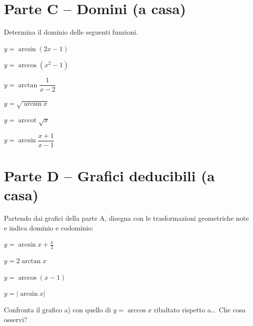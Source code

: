 \documentclass[11pt,a4paper]{article}
\DeclareMathOperator{\arccot}{arccot}
\begin{document}
\section*{Parte C -- Domini (a casa)}
Determina il dominio delle seguenti funzioni.
\begin{enumerate}[label=\alph*), itemsep=3pt]
\begin{minipage}[t]{0.42\textwidth}
\item $y=\arcsin(2x-1)$
\item $y=\arccos\left(x^2-1\right)$
\item $y=\arctan\dfrac{1}{x-2}$
\end{minipage}
\begin{minipage}[t]{0.42\textwidth}
\item $y=\sqrt{\arcsin x}$
\item $y=\arccot\sqrt{x}$
\item[$\ast$f)] $y=\arcsin\dfrac{x+1}{x-1}$
\end{minipage}
\end{enumerate}

\section*{Parte D -- Grafici deducibili (a casa)}
Partendo dai grafici della parte A, disegna con le trasformazioni geometriche note e indica dominio e codominio:
\begin{enumerate}[label=\alph*), itemsep=2pt]
\begin{minipage}[t]{0.42\textwidth}
\item $y=\arcsin x+\frac{\pi}{2}$
\item $y=2\arctan x$
\end{minipage}
\begin{minipage}[t]{0.42\textwidth}
\item $y=\arccos(x-1)$
\item $y=\left|\arcsin x\right|$
\end{minipage}
\end{enumerate}
Confronta il grafico a) con quello di $y=\arccos x$ ribaltato rispetto a\dots\ Che cosa osservi?
\end{document}
